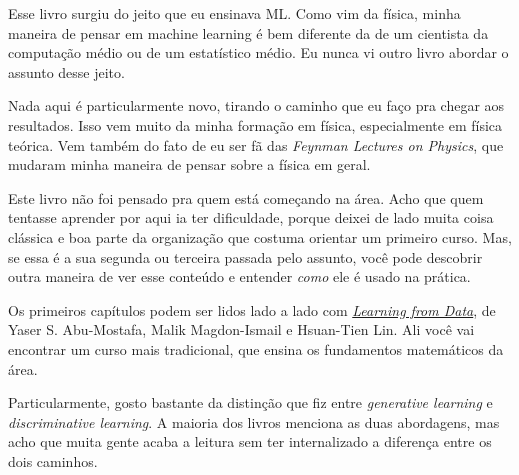 
Esse livro surgiu do jeito que eu ensinava ML. Como vim da física, minha maneira de pensar em machine learning é bem diferente da de um cientista da computação médio ou de um estatístico médio. Eu nunca vi outro livro abordar o assunto desse jeito.

Nada aqui é particularmente novo, tirando o caminho que eu faço pra chegar aos resultados. Isso vem muito da minha formação em física, especialmente em física teórica. Vem também do fato de eu ser fã das \emph{Feynman Lectures on Physics}, que mudaram minha maneira de pensar sobre a física em geral.

Este livro não foi pensado pra quem está começando na área. Acho que quem tentasse aprender por aqui ia ter dificuldade, porque deixei de lado muita coisa clássica e boa parte da organização que costuma orientar um primeiro curso. Mas, se essa é a sua segunda ou terceira passada pelo assunto, você pode descobrir outra maneira de ver esse conteúdo e entender \emph{como} ele é usado na prática.

Os primeiros capítulos podem ser lidos lado a lado com \href{https://amlbook.com/}{\emph{Learning from Data}}, de Yaser S. Abu-Mostafa, Malik Magdon-Ismail e Hsuan-Tien Lin. Ali você vai encontrar um curso mais tradicional, que ensina os fundamentos matemáticos da área.

Particularmente, gosto bastante da distinção que fiz entre \emph{generative learning} e \emph{discriminative learning}. A maioria dos livros menciona as duas abordagens, mas acho que muita gente acaba a leitura sem ter internalizado a diferença entre os dois caminhos.
